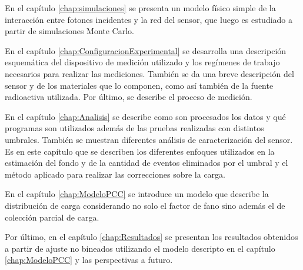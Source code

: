 En el capítulo \ref{chap:simulaciones} se presenta un modelo físico simple de la interacción entre fotones incidentes y la red del sensor, que luego es estudiado a partir de simulaciones Monte Carlo.

En el capítulo \ref{chap:ConfiguracionExperimental} se desarrolla una descripción esquemática del dispositivo de medición utilizado y los regímenes de trabajo necesarios para realizar las mediciones. También se da una breve descripción del sensor y de los materiales que lo componen, como así también de la fuente radioactiva utilizada. Por último, se describe el proceso de medición.

En el capítulo \ref{chap:Analisis} se describe como son procesados los datos y qué programas son utilizados además de las pruebas realizadas con distintos umbrales. También se muestran diferentes análisis de caracterización del sensor. Es en este capítulo que se describen los diferentes enfoques utilizados en la estimación del fondo y de la cantidad de eventos eliminados por el umbral y el método aplicado para realizar las correcciones sobre la carga.

En el capítulo \ref{chap:ModeloPCC} se introduce un modelo que describe la distribución de carga considerando no solo el factor de fano sino además el de colección parcial de carga. 

Por último, en el capítulo \ref{chap:Resultados} se presentan los resultados obtenidos a partir de ajuste no bineados utilizando el modelo descripto en el capítulo \ref{chap:ModeloPCC} y las perspectivas a futuro.


